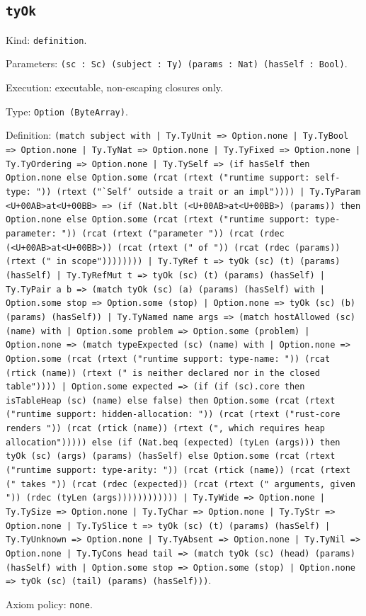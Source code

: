 \documentclass[11pt]{article}
\begin{document}
\subsection*{\texttt{tyOk}}
\noindent Kind: \texttt{definition}.\par
\noindent Parameters: \texttt{(sc : Sc) (subject : Ty) (params : Nat) (hasSelf : Bool)}.\par
\noindent Execution: executable, non-escaping closures only.\par
\noindent Type: \texttt{Option (ByteArray)}.\par
\noindent Definition: \texttt{(match subject with | Ty.TyUnit => Option.none | Ty.TyBool => Option.none | Ty.TyNat => Option.none | Ty.TyFixed => Option.none | Ty.TyOrdering => Option.none | Ty.TySelf => (if hasSelf then Option.none else Option.some (rcat (rtext ("runtime support: self-type: ")) (rtext ("`Self` outside a trait or an impl")))) | Ty.TyParam <U+00AB>at<U+00BB> => (if (Nat.blt (<U+00AB>at<U+00BB>) (params)) then Option.none else Option.some (rcat (rtext ("runtime support: type-parameter: ")) (rcat (rtext ("parameter ")) (rcat (rdec (<U+00AB>at<U+00BB>)) (rcat (rtext (" of ")) (rcat (rdec (params)) (rtext (" in scope")))))))) | Ty.TyRef t => tyOk (sc) (t) (params) (hasSelf) | Ty.TyRefMut t => tyOk (sc) (t) (params) (hasSelf) | Ty.TyPair a b => (match tyOk (sc) (a) (params) (hasSelf) with | Option.some stop => Option.some (stop) | Option.none => tyOk (sc) (b) (params) (hasSelf)) | Ty.TyNamed name args => (match hostAllowed (sc) (name) with | Option.some problem => Option.some (problem) | Option.none => (match typeExpected (sc) (name) with | Option.none => Option.some (rcat (rtext ("runtime support: type-name: ")) (rcat (rtick (name)) (rtext (" is neither declared nor in the closed table")))) | Option.some expected => (if (if (sc).core then isTableHeap (sc) (name) else false) then Option.some (rcat (rtext ("runtime support: hidden-allocation: ")) (rcat (rtext ("rust-core renders ")) (rcat (rtick (name)) (rtext (", which requires heap allocation"))))) else (if (Nat.beq (expected) (tyLen (args))) then tyOk (sc) (args) (params) (hasSelf) else Option.some (rcat (rtext ("runtime support: type-arity: ")) (rcat (rtick (name)) (rcat (rtext (" takes ")) (rcat (rdec (expected)) (rcat (rtext (" arguments, given ")) (rdec (tyLen (args)))))))))))) | Ty.TyWide => Option.none | Ty.TySize => Option.none | Ty.TyChar => Option.none | Ty.TyStr => Option.none | Ty.TySlice t => tyOk (sc) (t) (params) (hasSelf) | Ty.TyUnknown => Option.none | Ty.TyAbsent => Option.none | Ty.TyNil => Option.none | Ty.TyCons head tail => (match tyOk (sc) (head) (params) (hasSelf) with | Option.some stop => Option.some (stop) | Option.none => tyOk (sc) (tail) (params) (hasSelf)))}.\par
\noindent Axiom policy: \texttt{none}.\par
\end{document}
